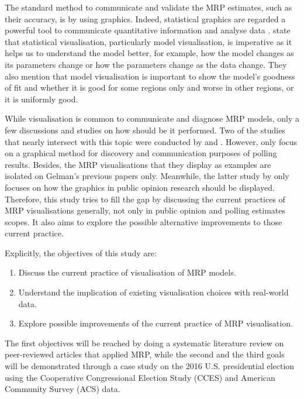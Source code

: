 \documentclass{monashthesis}
\begin{document}
The standard method to communicate and validate the MRP estimates, such as their accuracy, is by using graphics. Indeed, statistical graphics are regarded a powerful tool to communicate quantitative information and analyse data \autocite{ClevelandWilliamS,1983Gmfd}. \textcite{WickhamHadley2015VsmR} state that statistical visualisation, particularly model visualisation, is imperative as it helps us to understand the model better, for example, how the model changes as its parameters change or how the parameters change as the data change. They also mention that model visualisation is important to show the model's goodness of fit and whether it is good for some regions only and worse in other regions, or it is uniformly good.

While visualisation is common to communicate and diagnose MRP models, only a few discussions and studies on how should be it performed. Two of the studies that nearly intersect with this topic were conducted by \textcite{mekelagelman} and \textcite{saundra}. However, \textcite{mekelagelman} only focus on a graphical method for discovery and communication purposes of polling results. Besides, the MRP visualisations that they display as examples are isolated on Gelman's previous papers only. Meanwhile, the latter study by \textcite{saundra} only focuses on how the graphics in public opinion research should be displayed. Therefore, this study tries to fill the gap by discussing the current practices of MRP visualisations generally, not only in public opinion and polling estimates scopes. It also aims to explore the possible alternative improvements to those current practice.

Explicitly, the objectives of this study are:

\begin{enumerate}
\def\labelenumi{\arabic{enumi}.}
\tightlist
\item
  Discuss the current practice of visualisation of MRP models.
\item
  Understand the implication of existing visualisation choices with real-world data.
\item
  Explore possible improvements of the current practice of MRP visualisation.
\end{enumerate}

The first objectives will be reached by doing a systematic literature review on peer-reviewed articles that applied MRP, while the second and the third goals will be demonstrated through a case study on the 2016 U.S. presidential election using the Cooperative Congressional Election Study (CCES) and American Community Survey (ACS) data.
\end{document}
